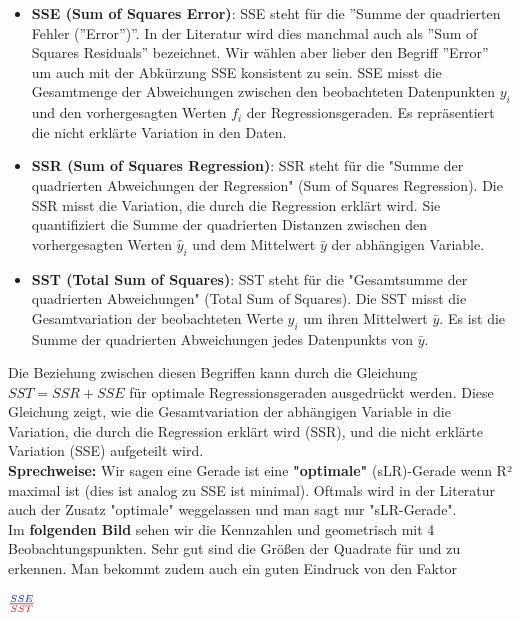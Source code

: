 \documentclass[12pt]{article}
\begin{document}
\begin{itemize}
    \item \textbf{SSE (Sum of Squares Error)}: SSE steht für die ”Summe der quadrierten Fehler (”Error”)”. In der Literatur wird dies manchmal auch als ”Sum of Squares Residuals” bezeichnet. Wir wählen aber lieber den Begriff ”Error” um auch mit der Abkürzung SSE konsistent zu sein. SSE misst die Gesamtmenge der Abweichungen zwischen den beobachteten Datenpunkten $y_i$ und den vorhergesagten Werten $ f_i $ der Regressionsgeraden. Es repräsentiert die nicht erklärte Variation in den Daten. 
    
    \item \textbf{SSR (Sum of Squares Regression)}: SSR steht für die "Summe der quadrierten Abweichungen der Regression" (Sum of Squares Regression). Die SSR misst die Variation, die durch die Regression erklärt wird. Sie quantifiziert die Summe der quadrierten Distanzen zwischen den vorhergesagten Werten \(\hat{y}_i\) und dem Mittelwert \(\bar{y}\) der abhängigen Variable.
    
    \item \textbf{SST (Total Sum of Squares)}: SST steht für die "Gesamtsumme der quadrierten Abweichungen" (Total Sum of Squares). Die SST misst die Gesamtvariation der beobachteten Werte \(y_i\) um ihren Mittelwert \(\bar{y}\). Es ist die Summe der quadrierten Abweichungen jedes Datenpunkts von \(\bar{y}\).
\end{itemize}
%
Die Beziehung zwischen diesen Begriffen kann durch die Gleichung \(SST = SSR + SSE\) für optimale Regressionsgeraden ausgedrückt werden. Diese Gleichung zeigt, wie die Gesamtvariation der abhängigen Variable in die Variation, die durch die Regression erklärt wird (SSR), und die nicht erklärte Variation (SSE) aufgeteilt wird.\\[0.2 cm]
% 
\textbf{Sprechweise:} Wir sagen eine Gerade ist eine \textbf{"optimale"} (sLR)-Gerade wenn R² maximal ist (dies ist analog zu SSE ist minimal). Oftmals wird in der Literatur auch der Zusatz "optimale" weggelassen und man sagt nur "sLR-Gerade".\\[0.4 cm]
% 
% 
Im \textbf{folgenden Bild} sehen wir die Kennzahlen {\color{blue}{SSE}} und {\color{red}{SST}} geometrisch mit 4 Beobachtungspunkten. Sehr gut sind die Größen der Quadrate für {\color{blue}{SSE}} und {\color{red}{SST}} zu erkennen. Man bekommt zudem auch ein guten Eindruck von den Faktor 
\begin{large}
$ \frac{\color{blue}{SSE}}{\color{red}{SST}} $\\[16.8cm]
\end{large}
\end{document}
